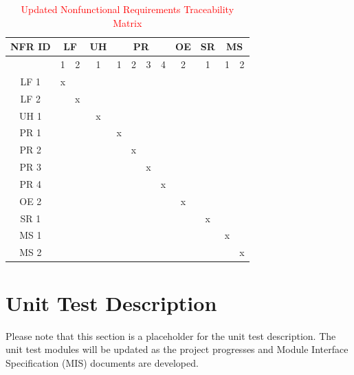 \documentclass[12pt, titlepage]{article}
\begin{document}
\begin{enumerate}
\begin{landscape}
\begin{table}[H]
  \centering
  \begin{tabular}{|c|cc|c|cccc|c|c|cc|}
    \hline
    \multicolumn{1}{|c|}{\textbf{NFR ID}} & \multicolumn{2}{c|}{\textbf{LF}} & \textbf{UH} & \multicolumn{4}{c|}{\textbf{PR}} & \textbf{OE} & \textbf{SR} & \multicolumn{2}{c|}{\textbf{MS}} \\ 
    \hline
    & 1 & 2 & 1 & 1 & 2 & 3 & 4 & 2 & 1 & 1 & 2 \\ 
    \hline
    LF 1 & x &  &  &  &  &  &  &  &  &  &  \\ 
    \hline
    LF 2 &  & x &  &  &  &  &  &  &  &  &  \\ 
    \hline
    UH 1 &  &  & x &  &  &  &  &  &  &  &  \\ 
    \hline
    PR 1 &  &  &  & x &  &  &  &  &  &  &  \\ 
    \hline
    PR 2 &  &  &  &  & x &  &  &  &  &  &  \\ 
    \hline
    PR 3 &  &  &  &  &  & x &  &  &  &  &  \\ 
    \hline
    PR 4 &  &  &  &  &  &  & x &  &  &  &  \\ 
    \hline
    OE 2 &  &  &  &  &  &  &  & x &  &  &  \\ 
    \hline
    SR 1 &  &  &  &  &  &  &  &  & x &  &  \\ 
    \hline
    MS 1 &  &  &  &  &  &  &  &  &  & x &  \\ 
    \hline
    MS 2 &  &  &  &  &  &  &  &  &  &  & x \\ 
    \hline
  \end{tabular}
  \caption{\textcolor{red}{Updated Nonfunctional Requirements Traceability Matrix}}
  \label{tab:nf_requirements}
\end{table}





  \end{landscape}
  
\section{Unit Test Description}
Please note that this section is a placeholder for the unit test description. The unit test modules will be updated as the project progresses and Module Interface Specification (MIS) documents are developed.

\end{enumerate}
\end{document}
